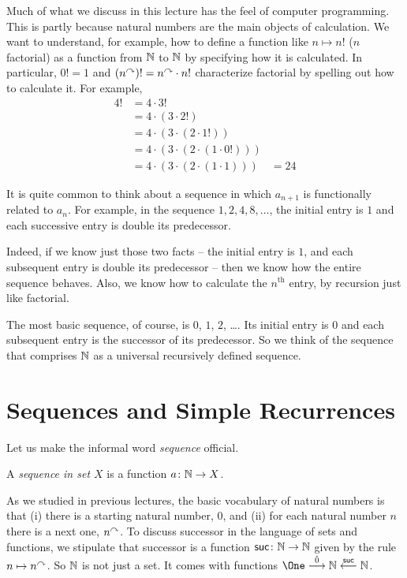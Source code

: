 Much of what we discuss in this lecture has the feel of computer programming.
This is partly because natural numbers are the main objects of calculation.
We want to understand, for example, how to define a function like $n\mapsto n!$ ($n$ factorial) as a function from $\mathbb N$ to $\mathbb N$ by specifying how it is calculated.
In particular, $0! = 1$ and $(n^\curvearrowright)! = n^\curvearrowright\cdot n!$ characterize factorial by spelling out how to calculate it.
For example,
\begin{align*}
	4!  &= 4 \cdot 3! \\
		&= 4 \cdot (3 \cdot 2!)\\
		&= 4 \cdot (3 \cdot (2 \cdot 1!))\\
		&= 4 \cdot (3 \cdot (2 \cdot (1 \cdot 0!)))\\
		&= 4 \cdot (3 \cdot (2 \cdot (1 \cdot 1)))
		&= 24
\end{align*}

It is quite common to think about a sequence in which $a_{n+1}$ is functionally related to $a_n$. 
For example, in the sequence $1, 2, 4, 8,\ldots$, the initial entry is $1$ and each successive entry is double its predecessor.

Indeed, if we know just those two facts -- the initial entry is $1$, and each subsequent entry is double its predecessor -- then we know how the entire sequence behaves.
Also, we know how to calculate the $n^{\text{th}}$ entry, by recursion just like factorial.

The most basic sequence, of course, is $0$, $1$, $2$, \ldots. 
Its initial entry is $0$ and each subsequent entry is the successor of its predecessor. 
So we think of the sequence that comprises $\mathbb N$ as a universal recursively defined sequence.

\section{Sequences and Simple Recurrences}

Let us make the informal word \emph{sequence} official.

\begin{defn}
	A \emph{sequence in set $X$} is a function ${a}\colon{\mathbb N}\to{X}$.
\end{defn}

As we studied in previous lectures, the basic vocabulary of natural numbers is that (i) there is a starting natural number, $0$, and (ii) for each natural number $n$ there is a next one, $n^\curvearrowright$. 
To discuss successor in the language of sets and functions, we stipulate that successor is a function ${\mathord{\textsf{suc}}}\colon{\mathbb N}\to{\mathbb N}$ given by the rule $n\mapsto n^\curvearrowright$.
So $\mathbb N$ is not just a set. 
It comes with functions $\One \stackrel{\hat{0}}{\longrightarrow} \NN \stackrel{\suc}{\longleftarrow} \NN$.

